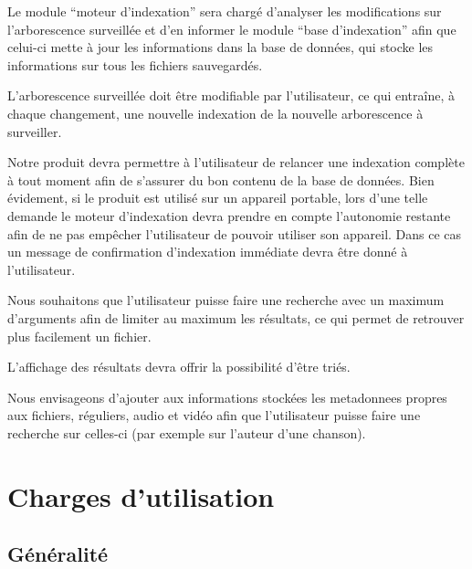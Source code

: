 \documentclass[a4paper,12pt]{report}
\begin{document}
Le module \enquote{moteur d'indexation} sera chargé d'analyser les modifications sur l'\gls{arborescence} surveillée et d'en informer le module \enquote{base d'indexation} afin que celui-ci mette à jour les informations dans la base de données, qui stocke les informations sur tous les \glspl{fichier} sauvegardés.

L'\gls{arborescence} surveillée doit être modifiable par l'utilisateur, ce qui entraîne, à chaque changement, une nouvelle indexation de la nouvelle \gls{arborescence} à surveiller.

Notre produit devra permettre à l'utilisateur de relancer une indexation complète à tout
moment afin de s'assurer du bon contenu de la base de données. Bien évidement, si le
produit est utilisé sur un appareil portable, lors d'une telle demande le moteur d'indexation devra prendre en compte l'autonomie restante afin de ne pas empêcher l'utilisateur de pouvoir utiliser son appareil. Dans ce cas un message de confirmation d'indexation immédiate devra être donné à l'utilisateur.

Nous souhaitons que l'utilisateur puisse faire une recherche avec un maximum d'arguments
afin de limiter au maximum les résultats, ce qui permet de retrouver plus facilement un \gls{fichier}.

L'affichage des résultats devra offrir la possibilité d'être triés.

Nous envisageons d'ajouter aux informations stockées les \glspl{metadonnee} propres aux fichiers, réguliers, audio et vidéo afin que l'utilisateur puisse faire une recherche sur celles-ci (par exemple sur l'auteur d'une chanson).

\chapter{Charges d'utilisation}

\section{Généralité}
\end{document}
